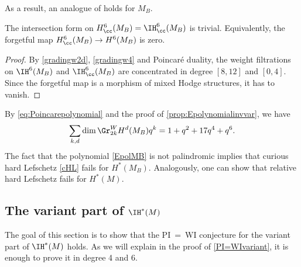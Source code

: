 As a result, an analogue of \cite[Cor.\,4.5.1]{HauselRodriguez-Villegas2008} holds for $M_B$.

\begin{cor}\label{vanishinginterform}
The intersection form on $H^6_{\cc}(M_B) = \IH^6_{\cc}(M_B)$ is trivial. Equivalently, the forgetful map $H^6_{\cc}(M_B) \to H^6(M_B)$ is zero.
\end{cor}

\begin{proof}
By \eqref{gradingw2d}, \eqref{gradingw4} and Poincaré duality, the weight filtrations on $\IH^6(M_B)$ and $\IH^6_{\cc}(M_B)$ are concentrated in degree $[8,12]$ and $[0,4]$. Since the forgetful map is a morphism of mixed Hodge structures, it has to vanish.
\end{proof}

\begin{rmk} \label{failurecurioushardLef}
By \eqref{eq:Poincarepolynomial} and the proof of \cref{prop:Epolynomialinvvar}, we have\vspace*{-3pt}
\begin{equation}\label{EpolMB}
\sum_{k, d} \dim \Gr^W_{2k}H^d(M_B) q^k = 1+q^2+17q^4+q^6.
\end{equation}
The fact that the polynomial \eqref{EpolMB} is not palindromic implies that curious hard Lefschetz \eqref{cHL} fails for $H^*(M_B)$. Analogously, one can show that relative hard Lefschetz fails for $H^*(M)$.
\end{rmk}

\subsection{The variant part of $\IH^{*}(M)$}\label{sec:The variant part}
The goal of this section is to show that the \hbox{PI = WI} conjecture for the variant part of $\IH^{*}(M)$ holds. As we will explain in the proof of \cref{PI=WIvariant}, it is enough to prove it in degree 4 and 6.

